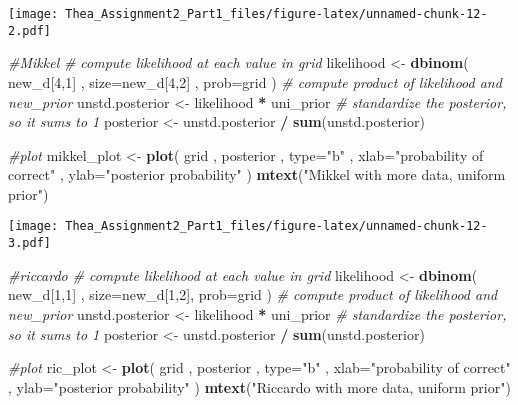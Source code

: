 \documentclass[]{article}
\newenvironment{Shaded}{\begin{snugshade}}{\end{snugshade}}
\newcommand{\KeywordTok}[1]{\textcolor[rgb]{0.13,0.29,0.53}{\textbf{#1}}}
\newcommand{\DataTypeTok}[1]{\textcolor[rgb]{0.13,0.29,0.53}{#1}}
\newcommand{\DecValTok}[1]{\textcolor[rgb]{0.00,0.00,0.81}{#1}}
\newcommand{\StringTok}[1]{\textcolor[rgb]{0.31,0.60,0.02}{#1}}
\newcommand{\CommentTok}[1]{\textcolor[rgb]{0.56,0.35,0.01}{\textit{#1}}}
\newcommand{\OperatorTok}[1]{\textcolor[rgb]{0.81,0.36,0.00}{\textbf{#1}}}
\newcommand{\NormalTok}[1]{#1}
\begin{document}
\texttt{[image: Thea\_Assignment2\_Part1\_files/figure-latex/unnamed-chunk-12-2.pdf]}

\begin{Shaded}
\begin{Highlighting}[]
\CommentTok{#Mikkel}
\CommentTok{# compute likelihood at each value in grid}
\NormalTok{likelihood <-}\StringTok{ }\KeywordTok{dbinom}\NormalTok{( new_d[}\DecValTok{4}\NormalTok{,}\DecValTok{1}\NormalTok{] , }\DataTypeTok{size=}\NormalTok{new_d[}\DecValTok{4}\NormalTok{,}\DecValTok{2}\NormalTok{] , }\DataTypeTok{prob=}\NormalTok{grid )}
\CommentTok{# compute product of likelihood and new_prior}
\NormalTok{unstd.posterior <-}\StringTok{ }\NormalTok{likelihood }\OperatorTok{*}\StringTok{ }\NormalTok{uni_prior}
\CommentTok{# standardize the posterior, so it sums to 1}
\NormalTok{posterior <-}\StringTok{ }\NormalTok{unstd.posterior }\OperatorTok{/}\StringTok{ }\KeywordTok{sum}\NormalTok{(unstd.posterior)}

\CommentTok{#plot}
\NormalTok{mikkel_plot <-}\StringTok{ }\KeywordTok{plot}\NormalTok{( grid , posterior , }\DataTypeTok{type=}\StringTok{"b"}\NormalTok{ ,}
    \DataTypeTok{xlab=}\StringTok{"probability of correct"}\NormalTok{ , }\DataTypeTok{ylab=}\StringTok{"posterior probability"}\NormalTok{ )}
\KeywordTok{mtext}\NormalTok{(}\StringTok{"Mikkel with more data, uniform prior"}\NormalTok{)}
\end{Highlighting}
\end{Shaded}

\texttt{[image: Thea\_Assignment2\_Part1\_files/figure-latex/unnamed-chunk-12-3.pdf]}

\begin{Shaded}
\begin{Highlighting}[]
\CommentTok{#riccardo}
\CommentTok{# compute likelihood at each value in grid}
\NormalTok{likelihood <-}\StringTok{ }\KeywordTok{dbinom}\NormalTok{( new_d[}\DecValTok{1}\NormalTok{,}\DecValTok{1}\NormalTok{] , }\DataTypeTok{size=}\NormalTok{new_d[}\DecValTok{1}\NormalTok{,}\DecValTok{2}\NormalTok{], }\DataTypeTok{prob=}\NormalTok{grid )}
\CommentTok{# compute product of likelihood and new_prior}
\NormalTok{unstd.posterior <-}\StringTok{ }\NormalTok{likelihood }\OperatorTok{*}\StringTok{ }\NormalTok{uni_prior}
\CommentTok{# standardize the posterior, so it sums to 1}
\NormalTok{posterior <-}\StringTok{ }\NormalTok{unstd.posterior }\OperatorTok{/}\StringTok{ }\KeywordTok{sum}\NormalTok{(unstd.posterior)}

\CommentTok{#plot}
\NormalTok{ric_plot <-}\StringTok{ }\KeywordTok{plot}\NormalTok{( grid , posterior , }\DataTypeTok{type=}\StringTok{"b"}\NormalTok{ ,}
    \DataTypeTok{xlab=}\StringTok{"probability of correct"}\NormalTok{ , }\DataTypeTok{ylab=}\StringTok{"posterior probability"}\NormalTok{ )}
\KeywordTok{mtext}\NormalTok{(}\StringTok{"Riccardo with more data, uniform prior"}\NormalTok{)}
\end{Highlighting}
\end{Shaded}
\end{document}
